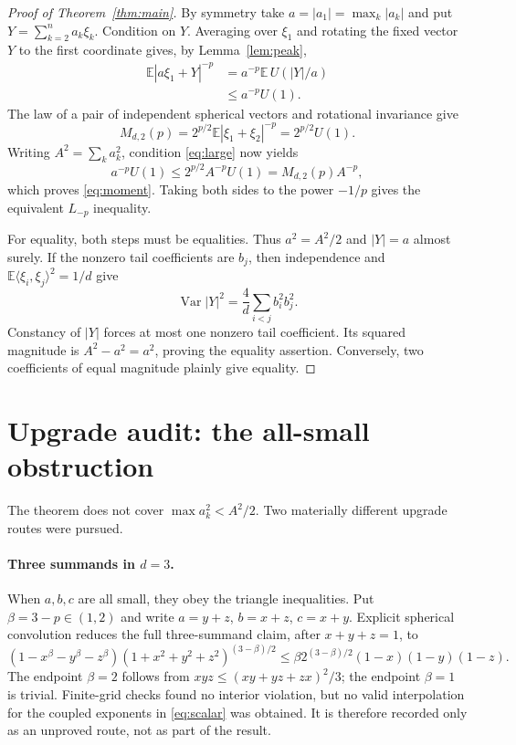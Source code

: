 \documentclass[11pt]{article}
\newcommand{\E}{\mathbb E}
\newcommand{\Var}{\operatorname{Var}}
\begin{document}
\begin{proof}[Proof of Theorem~\ref{thm:main}]
By symmetry take $a=|a_1|=\max_k|a_k|$ and put
$Y=\sum_{k=2}^n a_k\xi_k$.  Condition on $Y$.  Averaging over $\xi_1$ and
rotating the fixed vector $Y$ to the first coordinate gives, by
Lemma~\ref{lem:peak},
\begin{align*}
 \E\left|a\xi_1+Y\right|^{-p}
 &=a^{-p}\E\,U(|Y|/a)\\
 &\leq a^{-p}U(1).
\end{align*}
The law of a pair of independent spherical vectors and rotational invariance
give
\[
 M_{d,2}(p)=2^{p/2}\E|\xi_1+\xi_2|^{-p}
 =2^{p/2}U(1).
\]
Writing $A^2=\sum_k a_k^2$, condition \eqref{eq:large} now yields
\[
 a^{-p}U(1)\leq 2^{p/2}A^{-p}U(1)=M_{d,2}(p)A^{-p},
\]
which proves \eqref{eq:moment}.  Taking both sides to the power $-1/p$
gives the equivalent $L_{-p}$ inequality.

For equality, both steps must be equalities.  Thus $a^2=A^2/2$ and
$|Y|=a$ almost surely.  If the nonzero tail coefficients are $b_j$, then
independence and $\E\langle\xi_i,\xi_j\rangle^2=1/d$ give
\[
 \Var |Y|^2=\frac4d\sum_{i<j}b_i^2b_j^2.
\]
Constancy of $|Y|$ forces at most one nonzero tail coefficient.  Its squared
magnitude is $A^2-a^2=a^2$, proving the equality assertion.  Conversely, two
coefficients of equal magnitude plainly give equality.
\end{proof}

\section{Upgrade audit: the all-small obstruction}

The theorem does not cover $\max a_k^2<A^2/2$.  Two materially different
upgrade routes were pursued.

\paragraph{Three summands in $d=3$.}
When $a,b,c$ are all small, they obey the triangle inequalities.  Put
$\beta=3-p\in(1,2)$ and write
$a=y+z$, $b=x+z$, $c=x+y$.  Explicit spherical convolution reduces the full
three-summand claim, after $x+y+z=1$, to
\begin{equation}\label{eq:scalar}
 (1-x^\beta-y^\beta-z^\beta)(1+x^2+y^2+z^2)^{(3-\beta)/2}
 \leq \beta 2^{(3-\beta)/2}(1-x)(1-y)(1-z).
\end{equation}
The endpoint $\beta=2$ follows from
$xyz\leq(xy+yz+zx)^2/3$; the endpoint $\beta=1$ is trivial.  Finite-grid
checks found no interior violation, but no valid interpolation for the
coupled exponents in \eqref{eq:scalar} was obtained.  It is therefore recorded
only as an unproved route, not as part of the result.
\end{document}
